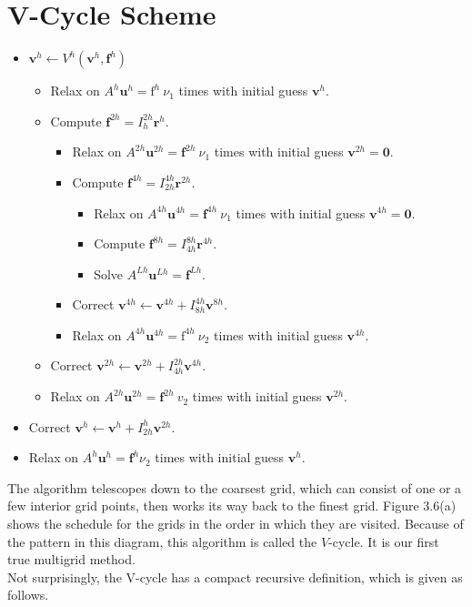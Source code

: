 \documentclass[11pt]{book}
\begin{document}
\section*{V-Cycle Scheme}
\begin{itemize}
\item $\mathbf{v}^h \leftarrow V^h\left(\mathbf{v}^h, \mathbf{f}^h\right)$
\begin{itemize}
\item Relax on $A^h \mathbf{u}^h=\mathrm{f}^h \ \nu_1$ times with initial guess $\mathbf{v}^h$.
\item Compute $\mathbf{f}^{2 h}=I_h^{2 h} \mathbf{r}^h$.
\begin{itemize}
\item Relax on $A^{2 h} \mathbf{u}^{2 h}=\mathbf{f}^{2 h} \ \nu_1$ times with initial guess $\mathbf{v}^{2 h}=\mathbf{0}$.
\item Compute $\mathbf{f}^{4 h}=I_{2 h}^{4 h} \mathbf{r}^{2 h}$.
\begin{itemize}
\item Relax on $A^{4 h} \mathbf{u}^{4 h}=\mathbf{f}^{4 h} \ \nu_1$ times with initial guess $\mathbf{v}^{4 h}=\mathbf{0}$.
\item Compute $\mathbf{f}^{8 h}=I_{4 h}^{8 h} \mathbf{r}^{4 h}$.
\item Solve $A^{L h} \mathbf{u}^{L h}=\mathbf{f}^{L h}$.
\end{itemize}
\item Correct $\mathbf{v}^{4 h} \leftarrow \mathbf{v}^{4 h}+I_{8 h}^{4 h} \mathbf{v}^{8 h}$.
\item Relax on $A^{4 h} \mathbf{u}^{4 h}=\mathrm{f}^{4 h} \ \nu_2$ times with initial guess $\mathbf{v}^{4 h}$.
\end{itemize}
\item Correct $\mathbf{v}^{2 h} \leftarrow \mathbf{v}^{2 h}+I_{4 h}^{2 h} \mathbf{v}^{4 h}$.
\item Relax on $A^{2 h} \mathbf{u}^{2 h}=\mathbf{f}^{2h} \ v_{2}$ times with initial guess $\mathbf {v}^{2h}$.
\end{itemize}
\item Correct $\mathbf{v}^h \leftarrow \mathbf{v}^h+I_{2 h}^h \mathbf{v}^{2 h}$.
\item Relax on $A^h \mathbf{u}^h=\mathbf{f}^h \nu_2$ times with initial guess $\mathbf{v}^h$.
\end{itemize}
The algorithm telescopes down to the coarsest grid, which can consist of one or a few interior grid points, then works its way back to the finest grid. Figure 3.6(a) shows the schedule for the grids in the order in which they are visited. Because of the pattern in this diagram, this algorithm is called the $V$-cycle. It is our first true multigrid method. \\
Not surprisingly, the V-cycle has a compact recursive definition, which is given as follows.
\end{document}

